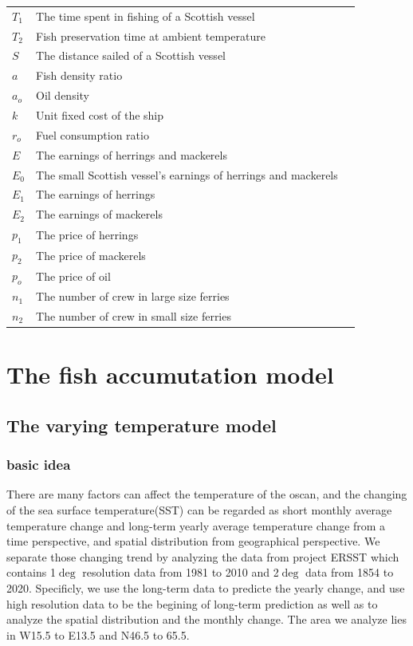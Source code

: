 \documentclass{mcmthesis}
\begin{document}
\begin{center}
\begin{longtable}{p{}p{}m{}}
$T_1$     & The time spent in fishing of a Scottish vessel   
                                                        \\
$T_2$       & Fish preservation time at ambient temperature        \\

$S$      & The distance sailed of a Scottish vessel   \\
$a$      & Fish density ratio \\
$a_o$      & Oil density \\
$k$      & Unit fixed cost of the ship  \\
$r_o$      & Fuel consumption ratio \\
$E$      & The earnings  of herrings and mackerels \\
$E_0$      & The small Scottish vessel's earnings  of herrings and mackerels \\
$E_1$      & The earnings  of herrings\\
$E_2$      & The earnings  of mackerels\\
$p_1$      & The price  of herrings \\
$p_2$      & The price  of mackerels  \\
$p_o$      & The price  of oil  \\
$n_1$      & The number  of  crew in large size ferries \\
$n_2$      & The number  of  crew in small size ferries  \\






 \end{longtable}
 \end{center}

 \section{The fish accumutation model}
 \subsection{The varying temperature model}
 \cite{long2014fast}
  \subsubsection{basic idea}
    There are many factors can affect the temperature of the oscan, and the changing of the sea surface temperature(SST) can be 
    regarded as short monthly average temperature change and long-term yearly average temperature change from a time perspective, and spatial distribution from geographical perspective. We separate those changing trend by analyzing the data from project ERSST which contains 1$\deg$ resolution data from 1981 to 2010 and 2$\deg$ data from 1854 to 2020. Specificly, we use the long-term data to predicte the yearly change, and use high resolution data to be the begining of long-term prediction as well as to analyze the spatial distribution and the monthly change. The area we analyze lies in W15.5 to E13.5 and N46.5 to 65.5.
    
\end{document}
